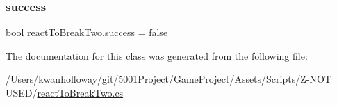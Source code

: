 \subsubsection{\texorpdfstring{success}{success}}
{\footnotesize\ttfamily bool react\+To\+Break\+Two.\+success = false}



The documentation for this class was generated from the following file\+:\begin{DoxyCompactItemize}
\item 
/\+Users/kwanholloway/git/5001\+Project/\+Game\+Project/\+Assets/\+Scripts/\+Z-\/\+N\+O\+T U\+S\+E\+D/\hyperlink{react_to_break_two_8cs}{react\+To\+Break\+Two.\+cs}\end{DoxyCompactItemize}
